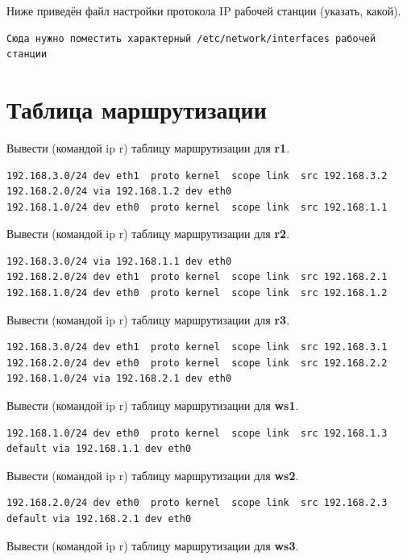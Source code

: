 \documentclass[a4paper,12pt]{article}
\begin{document}
Ниже приведён файл настройки протокола IP рабочей станции (указать, какой).

\begin{Verbatim}
Сюда нужно поместить характерный /etc/network/interfaces рабочей станции
\end{Verbatim}


\section{Таблица маршрутизации}

Вывести (командой ip r) таблицу маршрутизации для \textbf{r1}.

\begin{Verbatim}
192.168.3.0/24 dev eth1  proto kernel  scope link  src 192.168.3.2 
192.168.2.0/24 via 192.168.1.2 dev eth0 
192.168.1.0/24 dev eth0  proto kernel  scope link  src 192.168.1.1
\end{Verbatim}

Вывести (командой ip r) таблицу маршрутизации для \textbf{r2}.

\begin{Verbatim}
192.168.3.0/24 via 192.168.1.1 dev eth0 
192.168.2.0/24 dev eth1  proto kernel  scope link  src 192.168.2.1 
192.168.1.0/24 dev eth0  proto kernel  scope link  src 192.168.1.2
\end{Verbatim}

Вывести (командой ip r) таблицу маршрутизации для \textbf{r3}.

\begin{Verbatim}
192.168.3.0/24 dev eth1  proto kernel  scope link  src 192.168.3.1 
192.168.2.0/24 dev eth0  proto kernel  scope link  src 192.168.2.2 
192.168.1.0/24 via 192.168.2.1 dev eth0
\end{Verbatim}

Вывести (командой ip r) таблицу маршрутизации для \textbf{ws1}.

\begin{Verbatim}
192.168.1.0/24 dev eth0  proto kernel  scope link  src 192.168.1.3 
default via 192.168.1.1 dev eth0
\end{Verbatim}

Вывести (командой ip r) таблицу маршрутизации для \textbf{ws2}.

\begin{Verbatim}
192.168.2.0/24 dev eth0  proto kernel  scope link  src 192.168.2.3 
default via 192.168.2.1 dev eth0 
\end{Verbatim}

Вывести (командой ip r) таблицу маршрутизации для \textbf{ws3}.
\end{document}
